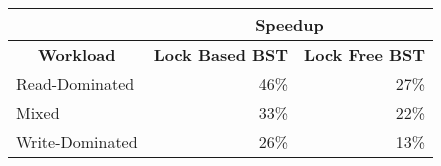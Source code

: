 \begin{table}[h]
\begin{tabular}{|l|r|r|}
\hline
                                        & \multicolumn{2}{c|}{\textbf{Speedup}}                                                  \\ \hline
\multicolumn{1}{|c|}{\textbf{Workload}} & \multicolumn{1}{c|}{\textbf{Lock Based BST}} & \multicolumn{1}{c|}{\textbf{Lock Free BST}} \\ \hline
Read-Dominated                          & 46\%                                      & 27\%                                      \\ \hline
Mixed                                   & 33\%                                       & 22\%                                      \\ \hline
Write-Dominated                         & 26\%                                       & 13\%                                      \\ \hline
\end{tabular}
\end{table}